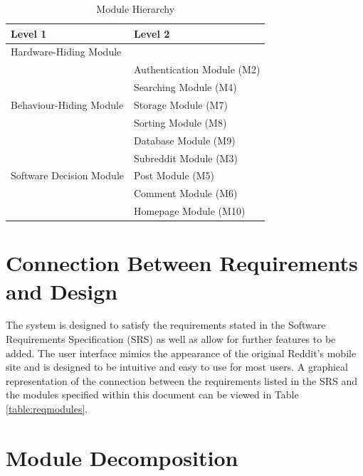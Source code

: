 \documentclass[12pt,fleqn]{article}
\begin{document}
\begin{table}[h!]
\centering
\begin{tabular}{p{} p{}}
\toprule
\textbf{Level 1} & \textbf{Level 2}\\
\midrule

{Hardware-Hiding Module} & ~ \\
\midrule

\multirow{5}{0.3\textwidth}{Behaviour-Hiding Module} 
& Authentication Module (M2)\\
& Searching Module (M4)\\
& Storage Module (M7)\\
& Sorting Module (M8)\\ 
& Database Module (M9)\\
\midrule

\multirow{3}{0.3\textwidth}{Software Decision Module}
& Subreddit Module (M3)\\
& Post Module (M5)\\
& Comment Module (M6)\\
& Homepage Module (M10)\\
\bottomrule

\end{tabular}
\caption{Module Hierarchy}
\label{TblMH}
\end{table}
\newpage

\section{Connection Between Requirements and Design} \label{sec:connection}

The system is designed to satisfy the requirements stated in the Software Requirements Specification (SRS) as well as allow for further features to be added. The user interface mimics the appearance of the original Reddit's mobile site and is designed to be intuitive and easy to use for most users. A graphical representation of the connection between the requirements listed in the SRS and the modules specified within this document can be viewed in Table \ref{table:reqmodules}.

\section{Module Decomposition} \label{sec:md}



\end{document}
